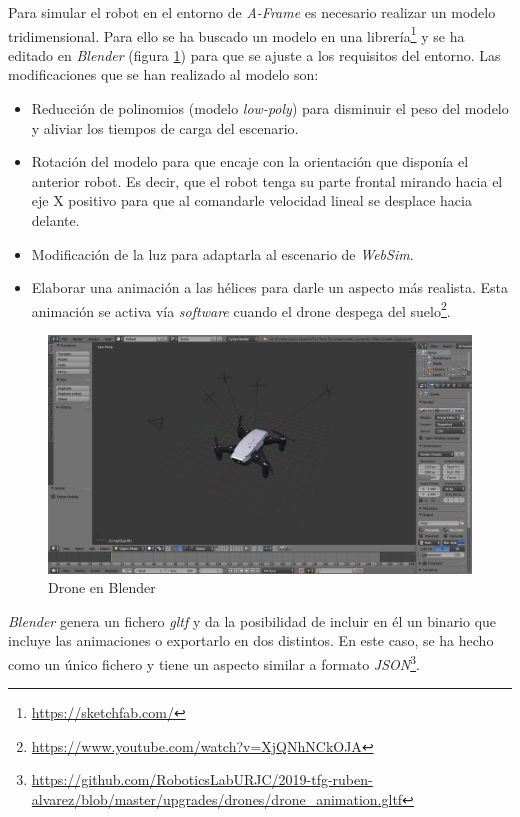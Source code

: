 Para simular el robot en el entorno de \textit{A-Frame} es necesario realizar un modelo tridimensional. Para ello se ha buscado un modelo en una librería\footnote{\url{https://sketchfab.com/}} y se ha editado en \textit{Blender} (figura \ref{fig:droneBlender}) para que se ajuste a los requisitos del entorno. Las modificaciones que se han realizado al modelo son: 
\begin{itemize}
    \item Reducción de polinomios (modelo \textit{low-poly}) para disminuir el peso del modelo y aliviar los tiempos de carga del escenario.
    \item Rotación del modelo para que encaje con la orientación que disponía el anterior robot. Es decir, que el robot tenga su parte frontal mirando hacia el eje X positivo para que al comandarle velocidad lineal se desplace hacia delante.
    \item Modificación de la luz para adaptarla al escenario de \textit{WebSim}. 
    
    \item Elaborar una animación a las hélices para darle un aspecto más realista. Esta animación se activa vía \textit{software} cuando el drone despega del suelo\footnote{\url{https://www.youtube.com/watch?v=XjQNhNCkOJA}}.
    
\end{itemize}

 \begin{figure}[H]
    \centering
    \includegraphics[scale=0.3]{img/droneBlender.jpg}
    \caption{Drone en Blender} \label{fig:droneBlender}
\end{figure}

\textit{Blender} genera un fichero \textit{gltf} y da la posibilidad de incluir en él un binario que incluye las animaciones o exportarlo en dos distintos. En este caso, se ha hecho como un único fichero y tiene un aspecto similar a formato \textit{JSON}\footnote{\url{https://github.com/RoboticsLabURJC/2019-tfg-ruben-alvarez/blob/master/upgrades/drones/drone_animation.gltf}}. 

